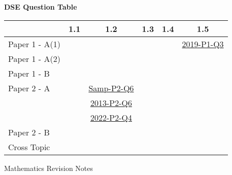 \documentclass[12pt, a4paper]{article}
\begin{document}
\begin{absolutelynopagebreak}
\begin{center}
\textbf{DSE Question Table}
\end{center}
\begin{center}
\begin{tabular}{|l|c|c|c|c|c|}
\hline
        & 1.1 & 1.2 & 1.3 & 1.4 & 1.5 \\\hline
\hline
Paper 1 - A(1)&  &  &  &  & \hyperref[DSE2019-CoreP1-Q03]{2019-P1-Q3} \\
\hline
Paper 1 - A(2)&  &  &  &  &  \\
\hline
Paper 1 - B&  &  &  &  &  \\
\hline
\hline
Paper 2 - A&  & \hyperref[DSE2012S-CoreP2-Q06]{Samp-P2-Q6} &  &  &  \\
&  & \hyperref[DSE2013-CoreP2-Q06]{2013-P2-Q6} &  &  &  \\
&  & \hyperref[DSE2022-CoreP2-Q04]{2022-P2-Q4} &  &  &  \\
\hline
Paper 2 - B&  &  &  &  &  \\
\hline
\hline
Cross Topic&  &  &  &  &  \\
\hline
\end{tabular}
\end{center}
\end{absolutelynopagebreak}
\newpage
\newpage
\thispagestyle{empty}
\begin{center}
Mathematics Revision Notes\\\vspace{1cm}
\\\vspace{1cm}
{\fontsize{24pt}{24pt}\selectfont {Quadratic Equations in One Unknown (II)}} \\\vspace{1cm}
\label{chapter:S4-2}

\end{center}
\vspace{0.5cm}
\hline
\end{document}
